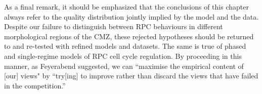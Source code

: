 As a final remark, it should be emphasized that the conclusions of this chapter always refer to the quality distribution jointly implied by the model and the data. Despite our failure to distinguish between RPC behaviours in different morphological regions of the CMZ, these rejected hypotheses should be returned to and re-tested with refined models and datasets. The same is true of phased and single-regime models of RPC cell cycle regulation. By proceeding in this manner, as Feyerabend suggested, we can ``maximise the empirical content of [our] views" by ``try[ing] to improve rather than discard the views that have failed in the competition.'' \cite[p.20]{Feyerabend1993}